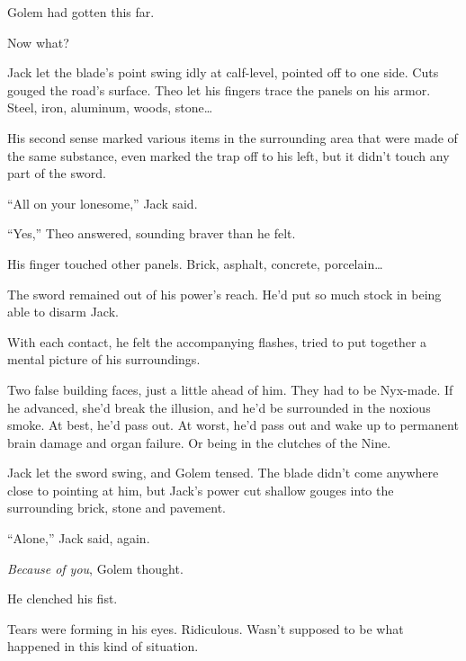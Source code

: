 Golem had gotten this far.



Now what?



Jack let the blade's point swing idly at calf-level, pointed off to one side.  Cuts gouged the road's surface.  Theo let his fingers trace the panels on his armor.  Steel, iron, aluminum, woods, stone\ldots



His second sense marked various items in the surrounding area that were made of the same substance, even marked the trap off to his left, but it didn't touch any part of the sword.



``All on your lonesome,'' Jack said.



``Yes,'' Theo answered, sounding braver than he felt.



His finger touched other panels.  Brick, asphalt, concrete, porcelain\ldots



The sword remained out of his power's reach.  He'd put so much stock in being able to disarm Jack.



With each contact, he felt the accompanying flashes, tried to put together a mental picture of his surroundings.



Two false building faces, just a little ahead of him.  They had to be Nyx-made.  If he advanced, she'd break the illusion, and he'd be surrounded in the noxious smoke.  At best, he'd pass out.  At worst, he'd pass out and wake up to permanent brain damage and organ failure.  Or being in the clutches of the Nine.



Jack let the sword swing, and Golem tensed.  The blade didn't come anywhere close to pointing at him, but Jack's power cut shallow gouges into the surrounding brick, stone and pavement.



``Alone,'' Jack said, again.



\emph{Because of you}, Golem thought.



He clenched his fist.



Tears were forming in his eyes.  Ridiculous.  Wasn't supposed to be what happened in this kind of situation.



